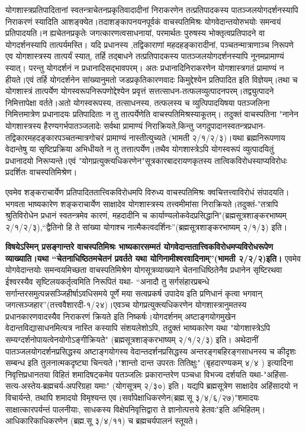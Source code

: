 योगशास्त्रप्रतिपादितानां स्वतन्त्राचेतनप्रकृतिवादादीनां निराकरणेन तत्प्रतिपादकस्य पातञ्जलयोगदर्शनस्यापि निराकरणं स्यादिति आशङ्क्येत।तदाशङ्कापनयनपूर्वकं वाचस्पतिमिश्रः योगवेदान्तयोरुभयोः समन्वयं प्रतिपादयति।न ह्यचेतनप्रकृतेः जगत्कारणत्वसाधनायां, परमार्थतः पुरुषस्य भोक्तृत्वप्रतिपादने वा योगदर्शनस्यापि तात्पर्यमस्ति। यदि प्रधानस्य ,तद्विकाराणां महदहङ्कारादीनां, पञ्चतन्मात्राणाञ्च निरूपणे एव योगशास्त्रस्य तात्पर्यं स्यात्, तर्हि तद्बाधने तत्प्रतिपादकस्य पातञ्जलयोगदर्शनस्यापि नूनमप्रामाण्यं स्यात्। परन्तु योगदर्शनं न प्रधानादिसद्भावपरम्। अतः प्रधानादिनिराकरणेन योगशास्त्रगतं प्रामाण्यं न हीयते।एवं तर्हि योगदर्शनेन सांख्यानुमतो जडप्रकृतिकारणवादः किमुद्देश्येन प्रतिपादित इति विज्ञेयम्।तथा च योगशास्त्रं तात्पर्येण योगस्वरूपनिरूपणोद्देश्येन प्रवृत्तं सत्तत्साधन-तत्फलव्युत्पादनपरम्।तद्व्युत्पादने निमित्तापेक्षा वर्तते।अतो योगस्वरूपस्य, तत्साधनस्य, तत्फलस्य च व्युत्पिपादयिषया पतञ्जलिना निमित्तमात्रेण प्रधानादयः प्रतिपादिताः न तु तात्पर्येणेति वाचस्पतिमिश्रस्याकूतम्। तदुक्तं वाचस्पतिना "नानेन योगशास्त्रस्य हैरण्यगर्भपातञ्जलादेः सर्वथा प्रामाण्यं निराक्रियते,किन्तु जगदुपादानस्वतन्त्रप्रधान-तद्विकारमहदङ्कारपञ्चतन्मात्रगोचरं प्रामाण्यं नास्तीत्युच्यते (भामती २/१/२/३)।यथा ब्रह्मनिरूपणाय वेदान्तेषु या सृष्टिप्रक्रिया अभिधीयते न तु तत्तात्पर्येण।तथैव योगशास्त्रेऽपि योगस्वरूपं व्युत्पादयितुं प्रधानादयो निरूप्यन्ते।एवं "योगप्रत्युक्त्यधिकरणेन"सूत्रकारबादरायणकृतस्य तात्विकविरोधस्याप्यविरोधः प्रदर्शितः वाचस्पतिमिश्रेण।

एवमेव शङ्कराचार्येण प्रतिपादिततात्त्विकविरोधमपि विरुध्य वाचस्पतिमिश्रः क्वचित्तत्त्वाविरोधं संपादयति।भगवता भाष्यकारेण शङ्कराचार्येण साक्षादेव योगशास्त्रस्य तत्त्वमीमांसा निराक्रियते।तदुक्तं-"तत्रापि श्रुतिविरोधेन प्रधानं स्वतन्त्रमेव कारणं, महदादीनि च कार्याण्यलोकवेदप्रसिद्धानि"(ब्रह्मसूत्रशाङ्करभाष्यम् २/१/२/३),“द्वैतिनो हि ते सांख्या योगाश्च नात्मैकत्वदर्शिनः”(ब्रह्मसूत्रशाङ्करभाष्यम् २/१/३) इति।

\textbf{विषयेऽस्मिन् प्रसङ्गान्तरे वाचस्पतिमिश्रः भाष्यकारसम्मतं योगवेदान्ततात्त्विकविरोधमप्यविरोधरूपेण व्याख्याति।यथा “चेतनाधिष्ठितमचेतनं प्रवर्तते यथा योगिनामीश्वरवादिनाम्”(भामती २/२/२)इति।} एवमेव योगवेदान्तयोः समन्वयमिच्छता वाचस्पतिमिश्रेण योगसूत्रव्याख्याने चेतनाधिष्ठितेनैव प्रधानेन सृष्टिरथवा ईश्वरस्यैव सृष्टिलयकर्तृत्वमिति निरूपितं यथा- “अनादौ तु सर्गसंहारप्रबन्धे सर्गान्तरसमुत्पन्नसञ्जिहीर्षाऽवधिसमये पूर्णे मया सत्वप्रकर्ष उपादेय इति प्रणिधानं कृत्वा भगवान् जगत्सञ्जहार”(तत्त्ववैशारदी-१/२४)।एवञ्च योगप्रत्युक्त्यधिकरणेन योगशास्त्रानुमतस्य प्रधानकारणवादस्यैव निराकरणं क्रियते इति निष्कर्षः।योगदर्शनम् अष्टाङ्गयोगमुखेन वेदान्तविद्यासाधनमित्यत्र नास्ति कस्यापि संशयलेशोऽपि, तदुक्तं भाष्यकारेण यथा "योगशास्त्रेऽपि सम्यग्दर्शनोपायत्वेनयोगोऽङ्गीक्रियते" (ब्रह्मसूत्रशाङ्करभाष्यम् २/१/२/३) इति। अथेदानीं पातञ्जलयोगदर्शनप्रसिद्धस्य अष्टाङ्गयोगस्य वेदान्तदर्शनप्रसिद्धस्य अन्तरङ्गबहिरङ्गसाधनस्य च कीदृशः सम्बन्ध इति तुलनात्मकदृष्ट्या चिन्त्यते।"शान्तो दान्त उपरतः तितिक्षुः" (बृहदारण्यकम् ४/४ ) इत्यादिना निवृत्तिप्रधानतया विहितं शमादिषट्कमेव पतञ्जलिः प्रकारान्तरेण पञ्चधा विभज्य दर्शयति यथा-"अहिंसा-सत्य-अस्तेय-ब्रह्मचर्य-अपरिग्रहा यमाः" (योगसूत्रम् २/३०) इति। यद्यपि ब्रह्मसूत्रेण साक्षादेव अहिंसादयो न विचार्यन्ते, तथापि शमादयो विमृश्यन्त एव।सर्वापेक्षाधिकरणेन(ब्रह्म.सू ३/४/६/२७)"शमादयः साक्षात्कारपर्यन्तं पालनीयाः, साधकस्य विक्षेपनिवृत्तिद्वारा ते ज्ञानोत्पत्तये हेतवः"इति अभिहितम्।आधिकारिकाधिकरणेन (ब्रह्म.सू ३/४/११) च ब्रह्मचर्यपालनं स्तूयते।

